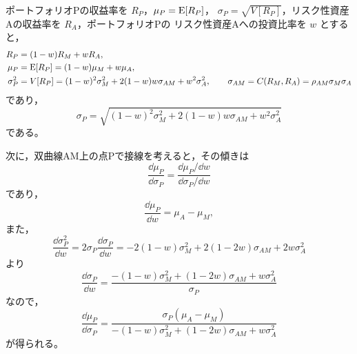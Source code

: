 ポートフォリオPの収益率を $R_P$，$\mu_P = \mathrm{E}[R_P]$，
$\sigma_P = \sqrt{V[R_P]}$，リスク性資産Aの収益率を $R_A$，ポートフォリオPの
リスク性資産Aへの投資比率を $w$ とすると，
\begin{align}
R_P &= (1-w)R_M + wR_A,\\
\mu_P &= \mathrm{E}[R_P] = (1-w)\mu_M + w\mu_A,\\
\sigma_P^2 &= V[R_P] = (1-w)^2\sigma_M^2 + 2(1-w)w\sigma_{AM} + w^2\sigma_A^2,
\qquad \sigma_{AM} = C(R_M,R_A) = \rho_{AM}\sigma_M\sigma_A
\end{align}
であり，
\begin{equation}
\sigma_P = \sqrt{(1-w)^2\sigma_M^2 + 2(1-w)w\sigma_{AM} + w^2\sigma_A^2}
\end{equation}
である。

次に，双曲線AM上の点Pで接線を考えると，その傾きは
\begin{equation}
\frac{\dd\mu_P}{\dd\sigma_P} = \frac{\dd\mu_P/\dd w}{\dd\sigma_P/\dd w}
\end{equation}
であり，
\begin{equation}
\frac{\dd\mu_P}{\dd w} = \mu_A - \mu_M,
\end{equation}
また，
\begin{equation}
\frac{\dd\sigma_P^2}{\dd w} = 2\sigma_P\frac{\dd\sigma_P}{\dd w}
= -2(1-w)\sigma_M^2 + 2(1-2w)\sigma_{AM} + 2w\sigma_A^2
\end{equation}
より
\begin{equation}
\frac{\dd\sigma_P}{\dd w}
= \frac{-(1-w)\sigma_M^2 + (1-2w)\sigma_{AM} + w\sigma_A^2}{\sigma_P}
\end{equation}
なので，
\begin{equation}
\frac{\dd\mu_P}{\dd\sigma_P}
= \frac{\sigma_P(\mu_A - \mu_M)}
{-(1-w)\sigma_M^2 + (1-2w)\sigma_{AM} + w\sigma_A^2}
\end{equation}
が得られる。

